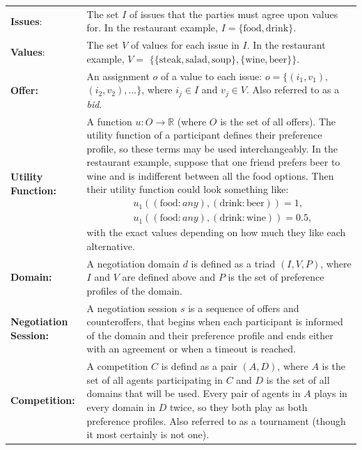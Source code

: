\documentclass[12pt]{article}
\numberwithin{equation}{section}
\begin{document}
				\renewcommand{\arraystretch}{1.5} %
				\begin{longtable}{l p{290pt}}

						\textbf{Issues}: & The set $I$ of issues that the parties must agree upon values for. In the restaurant example, $I=\{\text{food}, \text{drink}\}$. \\

						\textbf{Values}: & The set $V$ of values for each issue in $I$. In the restaurant example, $V=$ $\{\{\text{steak}, \text{salad}, \text{soup}\}, \{\text{wine}, \text{beer}\}\}$.\\

						\textbf{Offer:} & An assignment $o$ of a value to each issue: $o=\{(i_{1}, v_{1}),$ $(i_{2}, v_{2}), ...\}$, where $i_{j} \in I$ and $v_{j} \in V$. Also referred to as a \emph{bid}. \\

						\textbf{Utility Function:} & A function $u: O \to \mathbb{R}$ (where $O$ is the set of all offers). The utility function of a participant defines their preference profile, so these terms may be used interchangeably. In the restaurant example, suppose that one friend prefers beer to wine and is indifferent between all the food options. Then their utility function could look something like:
						\begin{equation*}
							\begin{aligned}
								& u_{1}((\text{food}: \textit{any}), (\text{drink}: \text{beer}))=1, \\
								& u_{1}((\text{food}: \textit{any}), (\text{drink}: \text{wine}))=0.5,
							\end{aligned}
						\end{equation*}
						with the exact values depending on how much they like each alternative.\\

						\textbf{Domain:} & A negotiation domain $d$ is defined as a triad $(I, V, P)$, where $I$ and $V$ are defined above and $P$ is the set of preference profiles of the domain\protect\footnotemark.\\
	
						\textbf{Negotiation Session:} & A negotiation session $s$ is a sequence of offers and counteroffers, that begins when each participant is informed of the domain and their preference profile and ends either with an agreement or when a timeout is reached. \\

						\textbf{Competition:} & A competition $C$ is defind as a pair $(A, D)$, where $A$ is the set of all agents participating in $C$ and $D$ is the set of all domains that will be used. Every pair of agents in $A$ plays in every domain in $D$ twice, so they both play as both preference profiles. Also referred to as a tournament (though it most certainly is not one).\\	%

				\end{longtable}
\end{document}
